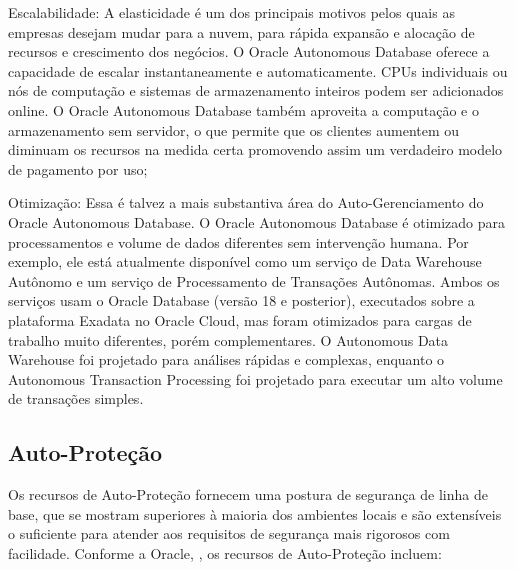 \begin{alineas}
\item Escalabilidade: A elasticidade é um dos principais motivos pelos quais as empresas desejam mudar para a nuvem, para rápida expansão e alocação de recursos e crescimento dos negócios. O Oracle Autonomous Database oferece a capacidade de escalar instantaneamente e automaticamente. CPUs individuais ou nós de computação e sistemas de armazenamento inteiros podem ser adicionados online. O Oracle Autonomous Database também aproveita a computação e o armazenamento sem servidor, o que permite que os clientes aumentem ou diminuam os recursos na medida certa promovendo assim um verdadeiro modelo de pagamento por uso;

\item Otimização: Essa é talvez a mais substantiva área do Auto-Gerenciamento do Oracle Autonomous Database. O Oracle Autonomous Database é otimizado para processamentos e volume de dados diferentes sem intervenção humana. Por exemplo, ele está atualmente disponível como um serviço de Data Warehouse Autônomo e um serviço de Processamento de Transações Autônomas. Ambos os serviços usam o Oracle Database (versão 18 e posterior), executados sobre a plataforma Exadata no Oracle Cloud, mas foram otimizados para cargas de trabalho muito diferentes, porém complementares. O Autonomous Data Warehouse foi projetado para análises rápidas e complexas, enquanto o Autonomous Transaction Processing foi projetado para executar um alto volume de transações simples.
\end{alineas}


\subsection{Auto-Proteção}


Os recursos de Auto-Proteção fornecem uma postura de segurança de linha de base, que se mostram superiores à maioria dos ambientes locais e são extensíveis o suficiente para atender aos requisitos de segurança mais rigorosos com facilidade. Conforme a Oracle, \cite{WPProtecao}, os recursos de Auto-Proteção incluem:

